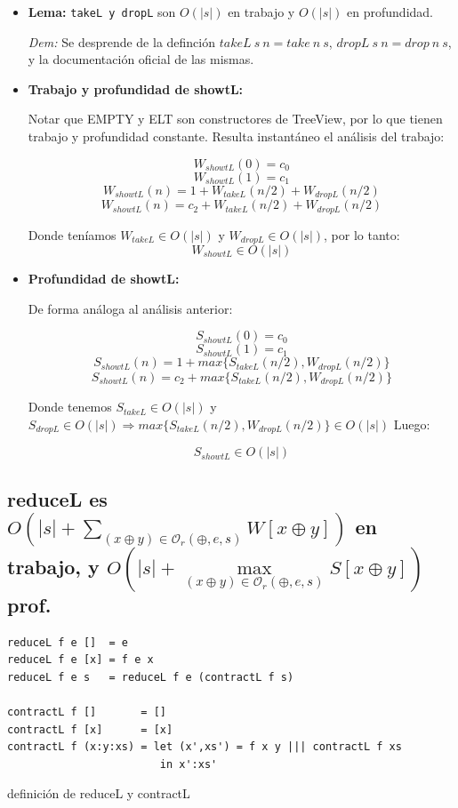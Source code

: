 \documentclass[12pt]{article}
\begin{document}
\begin{itemize}

\item \textbf{Lema:} \texttt{takeL y dropL} son $O(|s|)$ en trabajo y $O(|s|)$ en profundidad.

 \textit{Dem:} Se desprende de la definción $takeL\ s\ n = take\ n\ s$, $dropL\ s\ n = drop\ n\ s$, y la documentación oficial de las mismas. 

\item \textbf{Trabajo y profundidad de showtL:}

    Notar que EMPTY y ELT son constructores de TreeView, por lo que tienen trabajo y profundidad constante. Resulta instantáneo el análisis del trabajo: 

    $$ W_{showtL}(0) = c_0 $$
    $$ W_{showtL}(1) = c_1 $$
    $$ W_{showtL}(n) = 1 + W_{takeL}(n/2) + W_{dropL}(n/2)  $$
    $$ W_{showtL}(n) = c_2 + W_{takeL}(n/2) + W_{dropL}(n/2) $$

    Donde teníamos $W_{takeL} \in O(|s|)$ y $W_{dropL} \in O(|s|)$, por lo tanto:\\

    $$ W_{showtL} \in O(|s|) $$

\item \textbf{Profundidad de showtL:}
    
    De forma análoga al análisis anterior:

    $$ S_{showtL}(0) = c_0 $$
    $$ S_{showtL}(1) = c_1 $$
    $$ S_{showtL}(n) = 1 + max\{ S_{takeL}(n/2), W_{dropL}(n/2) \} $$
    $$ S_{showtL}(n) = c_2 + max\{ S_{takeL}(n/2), W_{dropL}(n/2) \} $$

    Donde tenemos $S_{takeL} \in O(|s|)$ y $S_{dropL} \in O(|s|) \Rightarrow max\{ S_{takeL}(n/2), W_{dropL}(n/2) \} \in O(|s|)$ Luego:

    $$ S_{showtL} \in O(|s|) $$
    
\end{itemize}


\subsection{reduceL es $O(|s| + \sum\limits_{(x\oplus y)\in\mathcal{O}_r(\oplus,e,s)} W[x\oplus y])$ en trabajo, y $O(|s| + \max\limits_{(x\oplus y)\in\mathcal{O}_r(\oplus,e,s)} S[x\oplus y])$ prof.}

\begin{table}[h]
\begin{lstlisting}
reduceL f e []  = e
reduceL f e [x] = f e x
reduceL f e s   = reduceL f e (contractL f s)

contractL f []       = []
contractL f [x]      = [x]
contractL f (x:y:xs) = let (x',xs') = f x y ||| contractL f xs 
                        in x':xs'
\end{lstlisting}
\caption{definición de reduceL y contractL}
\end{table}
\end{document}
